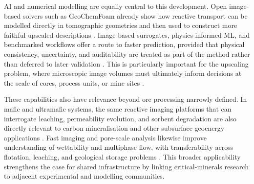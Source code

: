 \documentclass[12pt,a4paper]{article}
\begin{document}
AI and numerical modelling are equally central to this development. Open image-based solvers such as GeoChemFoam already show how reactive transport can be modelled directly in tomographic geometries and then used to construct more faithful upscaled descriptions \cite{maes_geochemfoam_2021}. Image-based surrogates, physics-informed ML, and benchmarked workflows offer a route to faster prediction, provided that physical consistency, uncertainty, and auditability are treated as part of the method rather than deferred to later validation \cite{graczyk_dl_porosity_2020, karniadakis_piml_2021, menke_geoenergy_ml_2026}. This is particularly important for the upscaling problem, where microscopic image volumes must ultimately inform decisions at the scale of cores, process units, or mine sites \cite{ml_upscaling_drp_2024, menke_upscaling_2021}.

These capabilities also have relevance beyond ore processing narrowly defined. In mafic and ultramafic systems, the same reactive imaging platforms that can interrogate leaching, permeability evolution, and sorbent degradation are also directly relevant to carbon mineralisation and other subsurface geoenergy applications \cite{matter_carbfix_2009, menke_dynamic_reaction_2015, menke_hydrogen_2024}. Fast imaging and pore-scale analysis likewise improve understanding of wettability and multiphase flow, with transferability across flotation, leaching, and geological storage problems \cite{bartels_fast_xray_2017, garfi_wetting_2022, berg_interface_darcy_2026}. This broader applicability strengthens the case for shared infrastructure by linking critical-minerals research to adjacent experimental and modelling communities.
\end{document}
